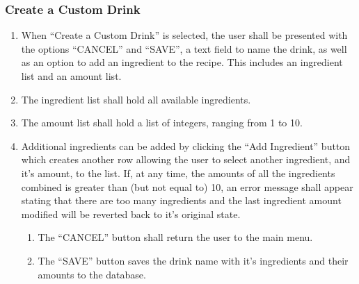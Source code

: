 {\subsubsection{Create a Custom Drink}
\begin{enumerate}
	\item  When ``Create a Custom Drink'' is selected, the user shall be presented with the options ``CANCEL'' and ``SAVE'', a text field to name the drink, as well as an option to add an ingredient to the recipe. This includes an ingredient list and an amount list.
	\item The ingredient list shall hold all available ingredients.
	\item The amount list shall hold a list of integers, ranging from 1 to 10.
	\item Additional ingredients can be added by clicking the ``Add Ingredient'' button which creates another row allowing the user to select another ingredient, and it's amount, to the list. If, at any time, the amounts of all the ingredients combined is greater than (but not equal to) 10, an error message shall appear stating that there are too many ingredients and the last ingredient amount modified will be reverted back to it's original state.
	\begin{enumerate}
		\item The ``CANCEL'' button shall return the user to the main menu.
		\item The ``SAVE'' button saves the drink name with it's ingredients and their amounts to the database.
	\end{enumerate}
\end{enumerate}

}

